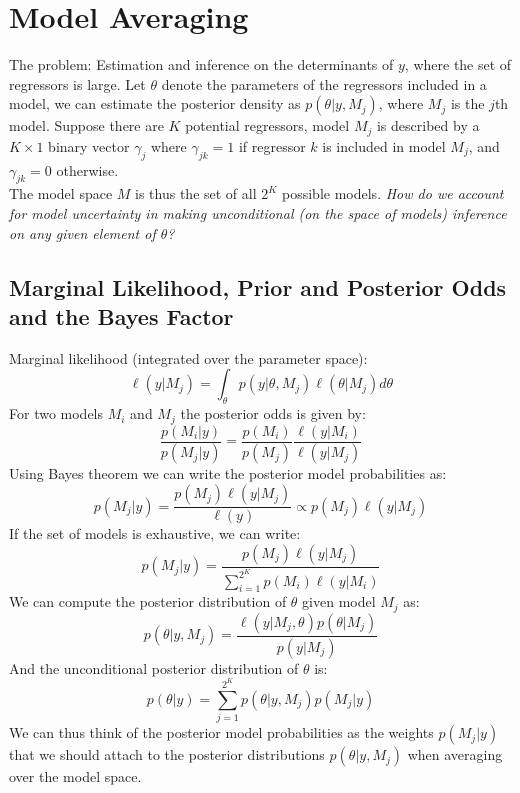 \documentclass[DIV=14,titlepage=false]{scrreprt}
\begin{document}
\section{Model Averaging}
The problem: Estimation and inference on the determinants of $y$, where the set of regressors is large. Let $\theta$ denote the parameters of the regressors included in a model, we can estimate the posterior density as $p(\theta|y, M_j)$, where $M_j$ is the $j$th model. Suppose there are $K$ potential regressors, model $M_j$ is described by a $K\times 1$ binary vector $\gamma_j$  where $\gamma_{jk} = 1$ if regressor $k$ is included in model $M_j$, and $\gamma_{jk} = 0$ otherwise.\\
The model space $M$ is thus the set of all $2^K$ possible models. \textit{How do we account for model uncertainty in making unconditional (on the space of models) inference on any given element of $\theta$?}
\subsection{Marginal Likelihood, Prior and Posterior Odds and the Bayes Factor}
Marginal likelihood (integrated over the parameter space):
\[
    \ell (y|M_j) = \int_{\theta} p(y|\theta, M_j)\ell(\theta|M_j)d\theta
\]
For two models $M_i$ and $M_j$ the posterior odds is given by:
\[
    \frac{p(M_i|y)}{p(M_j|y)} = \frac{p(M_i)}{p(M_j)}\frac{\ell(y|M_i)}{\ell(y|M_j)}   
\]
Using Bayes theorem we can write the posterior model probabilities as:
\[
    p(M_j|y) = \frac{p(M_j)\ell(y|M_j)}{\ell (y)} \propto p(M_j)\ell(y|M_j)
\]
If the set of models is exhaustive, we can write:
\[
    p(M_j|y) = \frac{p(M_j)\ell(y|M_j)}{\sum_{i=1}^{2^K} p(M_i)\ell(y|M_i)}
\]
We can compute the posterior distribution of $\theta$ given model $M_j$ as:
\[
    p(\theta|y, M_j) = \frac{\ell(y|M_j, \theta)p(\theta|M_j)}{p(y|M_j)}
\]
And the unconditional posterior distribution of $\theta$ is:
\[
    p(\theta|y) = \sum_{j=1}^{2^K} p(\theta|y, M_j)p(M_j|y)
\]
We can thus think of the posterior model probabilities as the weights $p(M_j|y)$ that we should attach to the posterior distributions $p(\theta|y, M_j)$ when averaging over the model space.
\end{document}
